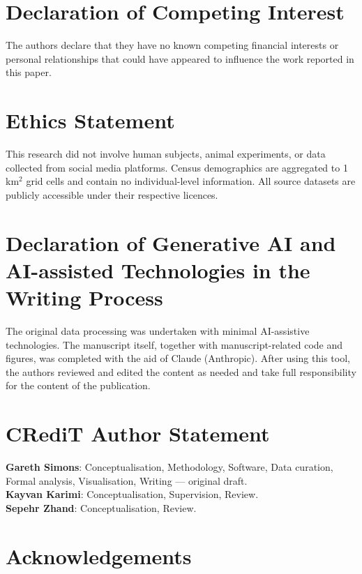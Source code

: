 \documentclass[review,authoryear]{elsarticle}
\begin{document}

\section*{Declaration of Competing Interest}

The authors declare that they have no known competing financial interests or personal relationships that could have appeared to influence the work reported in this paper.

\section*{Ethics Statement}

This research did not involve human subjects, animal experiments, or data collected from social media platforms. Census demographics are aggregated to 1\,km$^2$ grid cells and contain no individual-level information. All source datasets are publicly accessible under their respective licences.

\section*{Declaration of Generative AI and AI-assisted Technologies in the Writing Process}

The original data processing was undertaken with minimal AI-assistive technologies. The manuscript itself, together with manuscript-related code and figures, was completed with the aid of Claude (Anthropic). After using this tool, the authors reviewed and edited the content as needed and take full responsibility for the content of the publication.

\section*{CRediT Author Statement}

\noindent\textbf{Gareth Simons}: Conceptualisation, Methodology, Software, Data curation, Formal analysis, Visualisation, Writing --- original draft.\\
\textbf{Kayvan Karimi}: Conceptualisation, Supervision, Review.\\
\textbf{Sepehr Zhand}: Conceptualisation, Review.

\section*{Acknowledgements}
\end{document}
